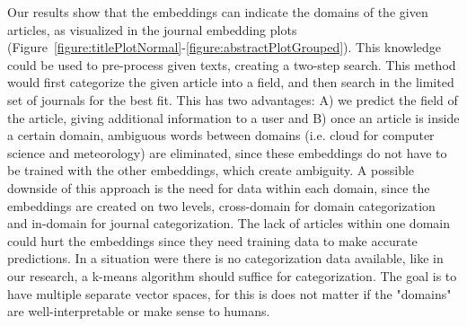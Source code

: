 \documentclass[../../Thesis.tex]{subfiles}
\begin{document}
Our results show that the embeddings can indicate the domains of the given articles, as visualized in the journal embedding plots (Figure~\ref{figure:titlePlotNormal}-\ref{figure:abstractPlotGrouped}). This knowledge could be used to pre-process given texts, creating a two-step search. This method would first categorize the given article into a field, and then search in the limited set of journals for the best fit. This has two advantages: A) we predict the field of the article, giving additional information to a user and B) once an article is inside a certain domain, ambiguous words between domains (i.e. cloud for computer science and meteorology) are eliminated, since these embeddings do not have to be trained with the other embeddings, which create ambiguity. A possible downside of this approach is the need for data within each domain, since the embeddings are created on two levels, cross-domain for domain categorization and in-domain for journal categorization. The lack of articles within one domain could hurt the embeddings since they need training data to make accurate predictions. In a situation were there is no categorization data available, like in our research, a k-means algorithm should suffice for categorization. The goal is to have multiple separate vector spaces, for this is does not matter if the "domains" are well-interpretable or make sense to humans.
\end{document}
